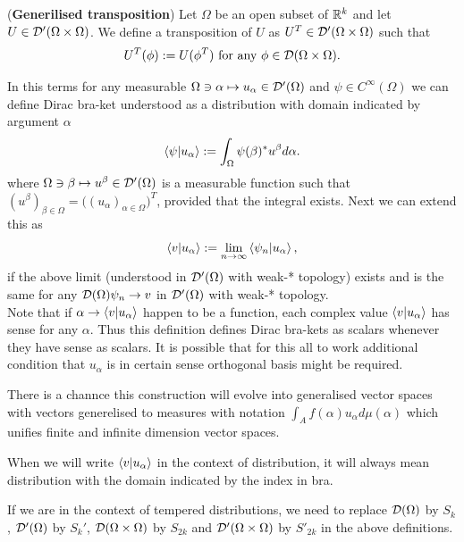 \documentclass[main.tex]{subfiles}
\begin{document}
\begin{definition} (\textbf{Generilised transposition})
Let $\Omega$ be an open subset of $\mathbb{R}^k$ and let $U\in \mathcal{D}'(\Omega\times\Omega)$. We define a transposition of $U$ as $U^T\in \mathcal{D}'(\Omega\times\Omega)$ such that
\begin{equation}
U^T(\phi) := U(\phi^T) \text{ for any } \phi\in\mathcal{D}(\Omega\times\Omega).
\end{equation}
\end{definition}
In this terms for any measurable $\Omega\ni\alpha \mapsto u_\alpha\in\mathcal{D}'(\Omega)$ and $\psi\in C^\infty(\Omega)$ we can define Dirac bra-ket understood as a distribution with domain indicated by argument $\alpha$ 
\begin{equation}
\braket{\psi}{u_\alpha} := \int_{\Omega} \psi(\beta)^* u^\beta d\alpha.
\end{equation} where $\Omega\ni\beta\mapsto u^\beta\in\mathcal{D}'(\Omega)$ is a measurable function such that $(u^\beta)_{\beta\in\Omega} = \big((u_\alpha)_{\alpha\in\Omega}\big)^T$, provided that the integral exists.
Next we can extend this as
\begin{equation}
\braket{v}{u_\alpha} := \lim_{n\to\infty} \braket{\psi_n}{u_\alpha},
\end{equation}
if the above limit (understood in $\mathcal{D}'(\Omega)$ with weak-* topology) exists and is the same for any $\mathcal{D}(\Omega)\psi_n\to v$ in $\mathcal{D}'(\Omega)$ with weak-* topology.\\
Note that if $\alpha\to \braket{v}{u_\alpha}$ happen to be a function, each complex value $\braket{v}{u_\alpha}$ has sense for any $\alpha$. Thus this definition defines Dirac bra-kets as scalars whenever they have sense as scalars. It is possible that for this all to work additional condition that $u_\alpha$ is in certain sense orthogonal basis might be required.

There is a channce this construction will evolve into generalised vector spaces with vectors generelised to measures with notation $\int_A f(\alpha)u_\alpha d\mu(\alpha)$ which unifies finite and infinite dimension vector spaces.

When we will write $\braket{v}{u_\alpha}$ in the context of distribution, it will always mean distribution with the domain indicated by the index in bra.
\begin{remark}
If we are in the context of tempered distributions, we need to replace $\mathcal{D}(\Omega)$ by $S_k$, $\mathcal{D}'(\Omega)$ by $S_k'$, $\mathcal{D}(\Omega\times\Omega)$ by $S_{2k}$ and $\mathcal{D}'(\Omega\times\Omega)$ by $S'_{2k}$ in the above definitions.  
\end{remark}
\end{document}
